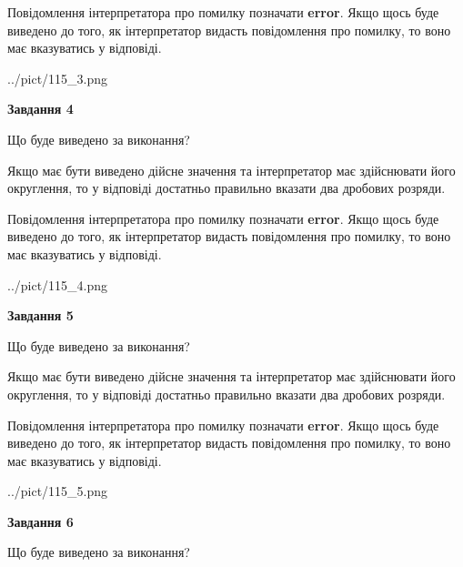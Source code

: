 \documentclass[12pt, ukrainian]{article}
\begin{document}
{\begin {Large}
Повідомлення інтерпретатора про помилку позначати \textbf{error}.
Якщо щось буде виведено до того, як інтерпретатор видасть повідомлення про помилку, 
то воно має вказуватись у відповіді. \par

\begin{center}
	{../pict/115_3.png}
\end{center}
\newpage

{\begin {center}\textbf{Завдання 4}\end {center}}\par
Що буде виведено за виконання? \par

Якщо має бути виведено дійсне значення та інтерпретатор має здійснювати його округлення, 
то у відповіді достатньо правильно вказати два дробових розряди.

Повідомлення інтерпретатора про помилку позначати \textbf{error}.
Якщо щось буде виведено до того, як інтерпретатор видасть повідомлення про помилку, 
то воно має вказуватись у відповіді. \par

\begin{center}
	{../pict/115_4.png}
\end{center}
\newpage

{\begin {center}\textbf{Завдання 5}\end {center}}\par
Що буде виведено за виконання? \par

Якщо має бути виведено дійсне значення та інтерпретатор має здійснювати його округлення, 
то у відповіді достатньо правильно вказати два дробових розряди.

Повідомлення інтерпретатора про помилку позначати \textbf{error}.
Якщо щось буде виведено до того, як інтерпретатор видасть повідомлення про помилку, 
то воно має вказуватись у відповіді. \par

\begin{center}
	{../pict/115_5.png}
\end{center}
\newpage

{\begin {center}\textbf{Завдання 6}\end {center}}\par
Що буде виведено за виконання? \par


\end{Large}}
\end{document}
